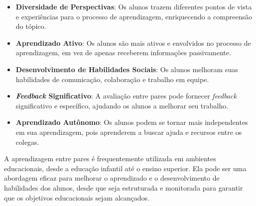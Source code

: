 \begin{itemize}
    \item \textbf{Diversidade de Perspectivas}: Os alunos trazem diferentes pontos de vista e experiências para o processo de aprendizagem, enriquecendo a compreensão do tópico.
    \item \textbf{Aprendizado Ativo}: Os alunos são mais ativos e envolvidos no processo de aprendizagem, em vez de apenas receberem informações passivamente.
    \item \textbf{Desenvolvimento de Habilidades Sociais}: Os alunos melhoram suas habilidades de comunicação, colaboração e trabalho em equipe.
    \item \textbf{\textit{Feedback} Significativo}: A avaliação entre pares pode fornecer \textit{feedback} significativo e específico, ajudando os alunos a melhorar seu trabalho.
    \item \textbf{Aprendizado Autônomo}: Os alunos podem se tornar mais independentes em sua aprendizagem, pois aprenderem a buscar ajuda e recursos entre os colegas.
\end{itemize}

A aprendizagem entre pares é frequentemente utilizada em ambientes educacionais, desde a educação infantil até o ensino superior. Ela pode ser uma abordagem eficaz para melhorar o aprendizado e o desenvolvimento de habilidades dos alunos, desde que seja estruturada e monitorada para garantir que os objetivos educacionais sejam alcançados.

